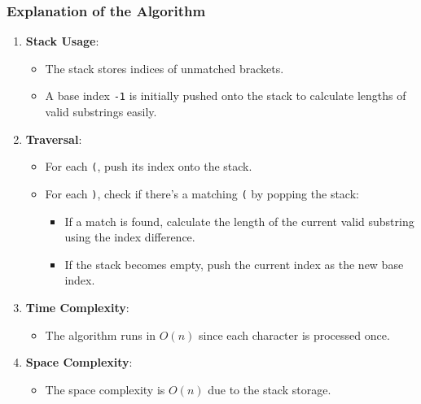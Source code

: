 \documentclass[a4paper]{article}
\begin{document}
\subsubsection{Explanation of the Algorithm}
\begin{enumerate}
\item 
\textbf{Stack Usage}:
\begin{itemize}
\item 
The stack stores indices of unmatched brackets.

\item 
A base index \verb|-1| is initially pushed onto the stack to calculate lengths of valid substrings easily.

\end{itemize}

\item 
\textbf{Traversal}:
\begin{itemize}
\item 
For each \verb|(|, push its index onto the stack.

\item 
For each \verb|)|, check if there's a matching \verb|(| by popping the stack:
\begin{itemize}
\item 
If a match is found, calculate the length of the current valid substring using the index difference.

\item 
If the stack becomes empty, push the current index as the new base index.

\end{itemize}

\end{itemize}

\item 
\textbf{Time Complexity}:
\begin{itemize}
\item 
The algorithm runs in \(O(n)\) since each character is processed once.

\end{itemize}

\item 
\textbf{Space Complexity}:
\begin{itemize}
\item 
The space complexity is \(O(n)\) due to the stack storage.

\end{itemize}

\end{enumerate}
\end{document}
